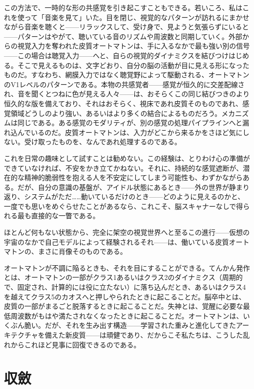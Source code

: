 \documentclass[11pt, twoside, openright]{book}
\begin{document}
この方法で、一時的な形の共感覚を引き起こすこともできる。若いころ、私はこれを使って「音楽を見て」いた。目を閉じ、視覚的なパターンが訪れるにまかせながら音楽を聴くと------リラックスして、受け身で、見ようと気張らずにいると------パターンはやがて、聴いている音のリズムや周波数と同期していく。外部からの視覚入力を奪われた皮質オートマトンは、手に入るなかで最も強い別の信号------この場合は聴覚入力------へと、自らの視覚的ダイナミクスを結びつけはじめる。そこで見えるものは、文字どおり、自分の脳の活動が目に見える形になったものだ。すなわち、網膜入力ではなく聴覚野によって駆動される、オートマトンのV1レベルのパターンである。本物の共感覚者------感覚が恒久的に交差配線され、音を聞くとつねに色が見える人々------は、おそらくこの同じ結びつきのより恒久的な版を備えており、それはおそらく、視床であれ皮質そのものであれ、感覚領域どうしのより強い、あるいはより多くの結合によるものだろう。メカニズムは同じである。ある感覚のモダリティが、別の感覚の処理パイプラインへと漏れ込んでいるのだ。皮質オートマトンは、入力がどこから来るかをさほど気にしない。受け取ったものを、なんであれ処理するのである。

これを日常の趣味として試すことは勧めない。この経験は、とりわけ心の準備ができていなければ、不安をかき立てかねない。それに、持続的な感覚遮断が、潜在的な精神的脆弱性を抱える人を不安定にしてしまう可能性も、わずかながらある。だが、自分の意識の基盤が、アイドル状態にあるとき------外の世界が静まり返り、システムがただ……動いているだけのとき------どのように見えるのかと、一度でも思いをめぐらせたことがあるなら、これこそ、脳スキャナーなしで得られる最も直接的な一瞥である。

ほとんど何もない状態から、完全に架空の視覚世界へと至るこの進行------仮想の宇宙のなかで自己モデルによって経験されるそれ------は、働いている皮質オートマトンの、まさに肖像そのものである。

オートマトンが不調に陥るときも、それを目にすることができる。てんかん発作とは、オートマトンの一部がクラス1あるいはクラス2のダイナミクス（周期的で、固定され、計算的には役に立たない）に落ち込んだとき、あるいはクラス4を越えてクラス5のカオスへと押しやられたときに起こることだ。脳卒中とは、皮質の一部がまるごと脱落するときに起こることだ。失神とは、覚醒に必要な最低周波数がもはや満たされなくなったときに起こることだ。オートマトンは、いくぶん脆い。だが、それを生み出す構造------学習された重みと進化してきたアーキテクチャを備えた新皮質------は頑健であり、だからこそ私たちは、こうした乱れからこれほど見事に回復できるのである。

\section*{収斂}
\end{document}
